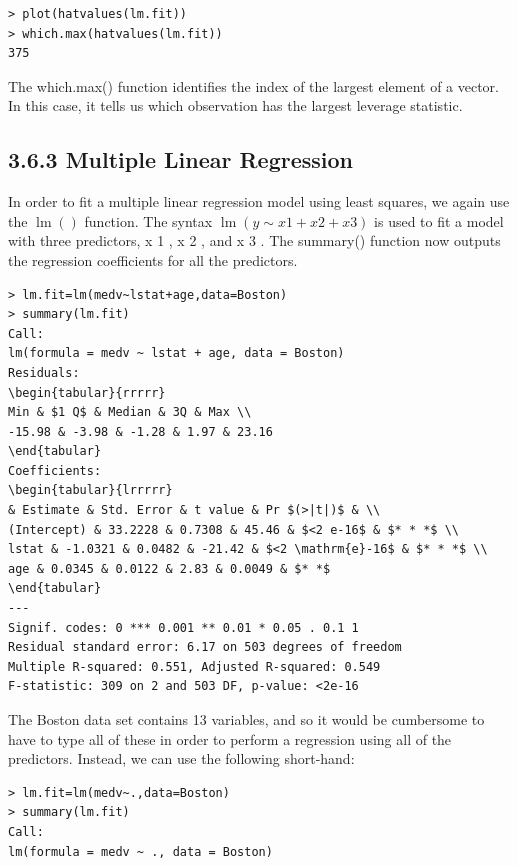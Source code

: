 \documentclass[10pt]{article}
\begin{document}
\begin{verbatim}
> plot(hatvalues(lm.fit))
> which.max(hatvalues(lm.fit))
375
\end{verbatim}

The which.max() function identifies the index of the largest element of a vector. In this case, it tells us which observation has the largest leverage statistic.

\subsection*{3.6.3 Multiple Linear Regression}
In order to fit a multiple linear regression model using least squares, we again use the $\operatorname{lm}()$ function. The syntax $\operatorname{lm}(y \sim x 1+x 2+x 3)$ is used to fit a model with three predictors, x 1 , x 2 , and x 3 . The summary() function now outputs the regression coefficients for all the predictors.

\begin{verbatim}
> lm.fit=lm(medv~lstat+age,data=Boston)
> summary(lm.fit)
Call:
lm(formula = medv ~ lstat + age, data = Boston)
Residuals:
\begin{tabular}{rrrrr} 
Min & $1 Q$ & Median & 3Q & Max \\
-15.98 & -3.98 & -1.28 & 1.97 & 23.16
\end{tabular}
Coefficients:
\begin{tabular}{lrrrrr} 
& Estimate & Std. Error & t value & Pr $(>|t|)$ & \\
(Intercept) & 33.2228 & 0.7308 & 45.46 & $<2 e-16$ & $* * *$ \\
lstat & -1.0321 & 0.0482 & -21.42 & $<2 \mathrm{e}-16$ & $* * *$ \\
age & 0.0345 & 0.0122 & 2.83 & 0.0049 & $* *$
\end{tabular}
---
Signif. codes: 0 *** 0.001 ** 0.01 * 0.05 . 0.1 1
Residual standard error: 6.17 on 503 degrees of freedom
Multiple R-squared: 0.551, Adjusted R-squared: 0.549
F-statistic: 309 on 2 and 503 DF, p-value: <2e-16
\end{verbatim}

The Boston data set contains 13 variables, and so it would be cumbersome to have to type all of these in order to perform a regression using all of the predictors. Instead, we can use the following short-hand:

\begin{verbatim}
> lm.fit=lm(medv~.,data=Boston)
> summary(lm.fit)
Call:
lm(formula = medv ~ ., data = Boston)
\end{verbatim}
\end{document}
